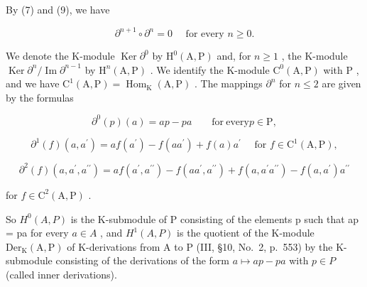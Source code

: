 By (7) and (9), we have

\[
\partial^ {n + 1} \circ \partial^ {n} = 0 \quad \text {   for   every   } n \geqslant 0.\tag{11}
\]

We denote the K-module \(\operatorname{Ker} \partial^0\) by \(\mathrm{H}^0(\mathrm{A},\mathrm{P})\) and, for \(n \geqslant 1\) , the K-module \(\operatorname{Ker} \partial^n/\operatorname{Im} \partial^{n-1}\) by \(\mathrm{H}^n(\mathrm{A},\mathrm{P})\) . We identify the K-module \(\mathrm{C}^0(\mathrm{A},\mathrm{P})\) with \(\mathrm{P}\) , and we have \(\mathrm{C}^1(\mathrm{A},\mathrm{P}) = \operatorname{Hom}_\mathrm{K}(\mathrm{A},\mathrm{P})\) . The mappings \(\partial^n\) for \(n \leqslant 2\) are given by the formulas

\[
\partial^ {0} (p) (a) = a p - p a \qquad \mathrm{for\ every} p \in \mathrm{P},\tag{12}
\]

\[
\partial^ {1} (f) \left(a, a ^ {\prime}\right) = a f \left(a ^ {\prime}\right) - f \left(a a ^ {\prime}\right) + f (a) a ^ {\prime} \quad \text { for } f \in \mathrm{C} ^ {1} (\mathrm{A}, \mathrm{P}),\tag{13}
\]

\[
\partial^ {2} (f) \left(a, a ^ {\prime}, a ^ {\prime \prime}\right) = a f \left(a ^ {\prime}, a ^ {\prime \prime}\right) - f \left(a a ^ {\prime}, a ^ {\prime \prime}\right) + f \left(a, a ^ {\prime} a ^ {\prime \prime}\right) - f \left(a, a ^ {\prime}\right) a ^ {\prime \prime}\tag{14}
\]

for \(f \in \mathrm{C}^2(\mathrm{A},\mathrm{P})\) .

So \(H^{0}(A,P)\) is the K-submodule of P consisting of the elements p such that ap = pa for every \(a \in A\) , and \(H^{1}(A,P)\) is the quotient of the K-module \(\mathrm{Der}_{\mathrm{K}}(\mathrm{A},\mathrm{P})\) of K-derivations from A to P (III, §10, No.~2, p.~553) by the K-submodule consisting of the derivations of the form \(a \mapsto ap - pa\) with \(p \in P\) (called inner derivations).


